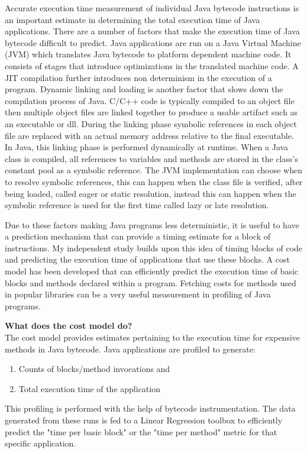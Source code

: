 \documentclass[11pt]{article}
\begin{document}
Accurate execution time measurement of individual Java bytecode instructions is an important estimate in determining the total execution time of Java applications. There are a number of factors that make the execution time of Java bytecode difficult to predict. Java applications are run on a Java Virtual Machine (JVM) which translates Java bytecode to platform dependent machine code. It consists of stages that introduce optimizations in the translated machine code. A JIT compilation further introduces non determinism in the execution of a program. Dynamic linking and loading is another factor that slows down the compilation process of Java. C/C++ code is typically compiled to an object file then multiple object files are linked together to produce a usable artifact such as an executable or dll. During the linking phase symbolic references in each object file are replaced with an actual memory address relative to the final executable. In Java, this linking phase is performed dynamically at runtime. When a Java class is compiled, all references to variables and methods are stored in the class's constant pool as a symbolic reference.\citep{javabytecode} The JVM implementation can choose when to resolve symbolic references, this can happen when the class file is verified, after being loaded, called eager or static resolution, instead this can happen when the symbolic reference is used for the first time called lazy or late resolution.\citep{jvm} \newline

Due to these factors making Java programs less deterministic, it is useful to have a prediction mechanism that can provide a timing estimate for a block of instructions. My independent study builds upon this idea of timing blocks of code and predicting the execution time of applications that use these blocks. A cost model has been developed that can efficiently predict the execution time of basic blocks and methods declared within a program. Fetching costs for methods used in popular libraries can be a very useful measurement in profiling of Java programs.\newline

\textbf{What does the cost model do?}\newline
\\The cost model provides estimates pertaining to the execution time for expensive methods in Java bytecode. Java applications are profiled to generate: 
\begin{enumerate}
\item Counts of blocks/method invocations and 
\item Total execution time of the application  
\end{enumerate}
This profiling is performed with the help of bytecode instrumentation. The data generated from these runs is fed to a Linear Regression toolbox to efficiently predict the "time per basic block" or the "time per method" metric for that specific application.\newline
\end{document}
